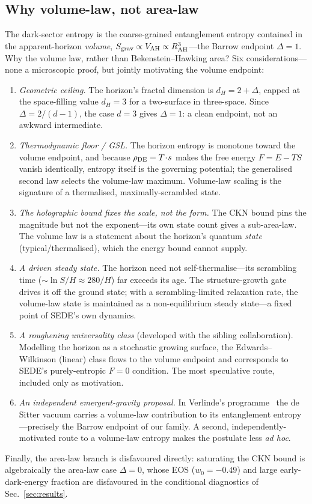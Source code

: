\subsection{Why volume-law, not area-law}
The dark-sector entropy is the coarse-grained entanglement entropy contained in the apparent-horizon
\emph{volume}, $S_{\rm grav}\propto V_{\mathrm{AH}}\propto R_{\mathrm{AH}}^3$---the Barrow endpoint $\Delta=1$. Why the volume
law, rather than Bekenstein--Hawking area? Six considerations---none a microscopic proof, but jointly
motivating the volume endpoint:
\begin{enumerate}
\item \emph{Geometric ceiling.} The horizon's fractal dimension is $d_H=2+\Delta$, capped at the
space-filling value $d_H=3$ for a two-surface in three-space. Since $\Delta=2/(d-1)$, the case $d=3$
gives $\Delta=1$: a clean endpoint, not an awkward intermediate.
\item \emph{Thermodynamic floor / GSL.} The horizon entropy is monotone toward the volume endpoint, and
because $\rho_{\mathrm{DE}}=T\!\cdot\!s$ makes the free energy $F=E-TS$ vanish identically, entropy itself is the
governing potential; the generalised second law selects the volume-law maximum. Volume-law scaling is
the signature of a thermalised, maximally-scrambled state.
\item \emph{The holographic bound fixes the scale, not the form.} The CKN bound pins the magnitude but
not the exponent---its own state count gives a sub-area-law. The volume law is a statement about the
horizon's quantum \emph{state} (typical/thermalised), which the energy bound cannot supply.
\item \emph{A driven steady state.} The horizon need not self-thermalise---its scrambling time
($\sim\ln S/H\approx280/H$) far exceeds its age. The structure-growth gate drives it off the ground
state; with a scrambling-limited relaxation rate, the volume-law state is maintained as a
non-equilibrium steady state---a fixed point of SEDE's own dynamics.
\item \emph{A roughening universality class} (developed with the sibling collaboration). Modelling the
horizon as a stochastic growing surface, the Edwards--Wilkinson (linear) class flows to the volume
endpoint and corresponds to SEDE's purely-entropic $F=0$ condition. The most speculative route,
included only as motivation.
\item \emph{An independent emergent-gravity proposal.} In Verlinde's programme~\cite{Verlinde:2016toy}
the de Sitter vacuum carries a volume-law contribution to its entanglement entropy---precisely the
Barrow endpoint of our family. A second, independently-motivated route to a volume-law entropy makes
the postulate less \emph{ad hoc}.
\end{enumerate}
Finally, the area-law branch is disfavoured directly: saturating the CKN bound is algebraically the
area-law case $\Delta=0$, whose EOS ($w_0=-0.49$) and large early-dark-energy fraction are disfavoured
in the conditional diagnostics of Sec.~\ref{sec:results}.

